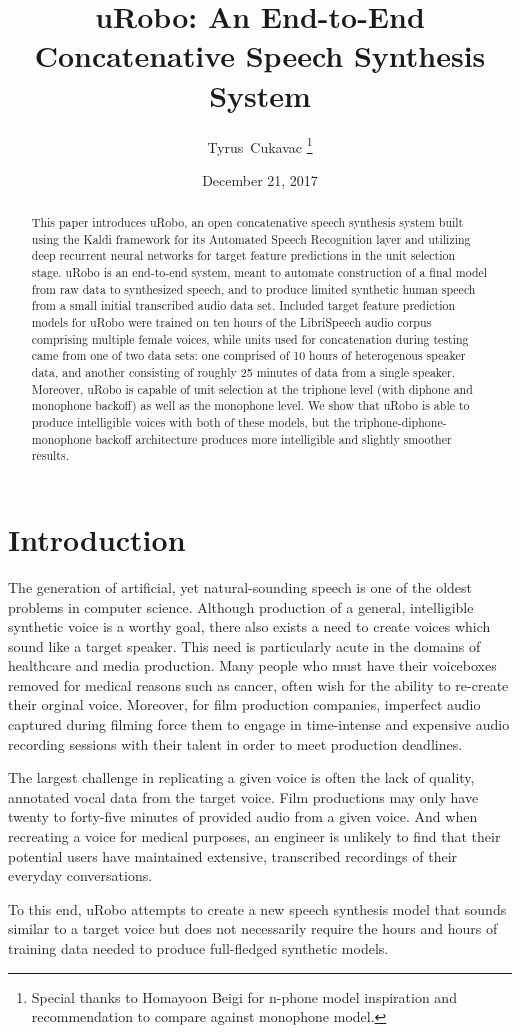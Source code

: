 \documentclass[10pt, journal, compsoc]{IEEEtran}
\author{Tyrus~Cukavac%
\thanks{Special thanks to Homayoon Beigi for n-phone model inspiration and recommendation to compare against monophone model.}}
\title{uRobo: An End-to-End Concatenative Speech Synthesis System}
\date{December 21, 2017}
\begin{document}
\maketitle
\begin{abstract}
This paper introduces uRobo, an open concatenative speech synthesis system built using the Kaldi framework for its Automated Speech Recognition layer and utilizing deep recurrent neural networks for target feature predictions in the unit selection stage. uRobo is an end-to-end system, meant to automate construction of a final model from raw data to synthesized speech, and to produce limited synthetic human speech from a small initial transcribed audio data set. Included target feature prediction models for uRobo were trained on ten hours of the LibriSpeech audio corpus comprising multiple female voices, while units used for concatenation during testing came from one of two data sets: one comprised of 10 hours of heterogenous speaker data, and another consisting of roughly 25 minutes of data from a single speaker. Moreover, uRobo is capable of unit selection at the triphone level (with diphone and monophone backoff) as well as the monophone level. We show that uRobo is able to produce intelligible voices with both of these models, but the triphone-diphone-monophone backoff architecture produces more intelligible and slightly smoother results.
\end{abstract}
\section{Introduction}
The generation of artificial, yet natural-sounding speech is one of the oldest problems in computer science. Although production of a general, intelligible synthetic voice is a worthy goal, there also exists a need to create voices which sound like a target speaker. This need is particularly acute in the domains of healthcare and media production. Many people who must have their voiceboxes removed for medical reasons such as cancer, often wish for the ability to re-create their orginal voice. Moreover, for film production companies, imperfect audio captured during filming force them to engage in time-intense and expensive audio recording sessions with their talent in order to meet production deadlines.\par
The largest challenge in replicating a given voice is often the lack of quality, annotated vocal data from the target voice. Film productions may only have twenty to forty-five minutes of provided audio from a given voice. And when recreating a voice for medical purposes, an engineer is unlikely to find that their potential users have maintained extensive, transcribed recordings of their everyday conversations.\par
To this end, uRobo attempts to create a new speech synthesis model that sounds similar to a target voice but does not necessarily require the hours and hours of training data needed to produce full-fledged synthetic models.
\end{document}
